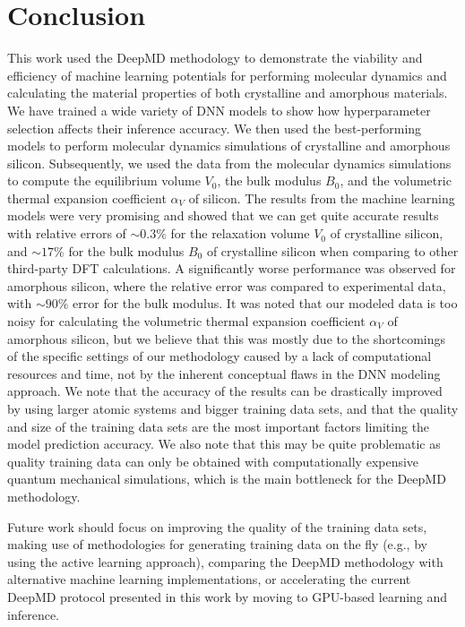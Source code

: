 \chapter{Conclusion}

This work used the DeepMD methodology to demonstrate the viability and
efficiency of machine learning potentials for performing molecular dynamics
and calculating the material properties of both crystalline and amorphous
materials. We have trained a wide variety of DNN models to show how
hyperparameter selection affects their inference accuracy. We then used the
best-performing models to perform molecular dynamics simulations of crystalline and amorphous silicon. Subsequently, we
used the data from the molecular dynamics simulations to compute the
equilibrium volume $V_0$, the bulk modulus $B_0$, and the volumetric thermal
expansion coefficient $\alpha_V$ of silicon. The results from the machine
learning models were very promising and showed that we can get quite accurate
results with relative errors of $\sim 0.3\%$ for the relaxation volume $V_0$
of crystalline silicon, and $\sim 17 \%$ for the bulk modulus $B_0$ of crystalline
silicon when comparing to other third-party DFT calculations. A significantly
worse performance was observed for amorphous silicon, where the relative error
was compared to experimental data, with $\sim 90 \%$ error for the bulk modulus.
It was noted that our modeled data is too noisy for calculating the volumetric
thermal expansion coefficient $\alpha_V$ of amorphous silicon, but we believe that this
was mostly due to the shortcomings of the specific settings of our methodology
caused by a lack of computational resources and time, not by the inherent conceptual flaws in
the DNN modeling approach. We note that the accuracy of the results can be
drastically improved by using larger atomic systems and bigger training data sets,
and that the quality and size of the training data sets are the most important factors limiting the
model prediction accuracy. We also note that this may be quite problematic as
quality training data can only be obtained with computationally expensive
quantum mechanical simulations, which is the main bottleneck for the DeepMD
methodology.

Future work should focus on improving the quality of the training data sets,
making use of methodologies for generating training data on the fly (e.g., by
using the active learning approach), comparing the DeepMD methodology with
alternative machine learning implementations, or accelerating the current DeepMD
protocol presented in this work by moving to GPU-based learning and inference.
